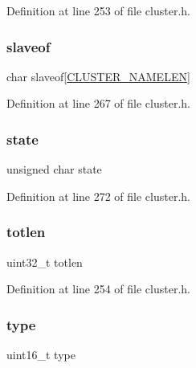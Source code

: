 Definition at line 253 of file cluster.\+h.

\mbox{\label{structcluster_msg_a110072ca1cda63a0b08d06c3195056e2}} 
\subsubsection{\texorpdfstring{slaveof}{slaveof}}
{\footnotesize\ttfamily char slaveof\mbox{[}\hyperlink{cluster_8h_ace7a882972eff7149675252938643b6e}{C\+L\+U\+S\+T\+E\+R\+\_\+\+N\+A\+M\+E\+L\+EN}\mbox{]}}



Definition at line 267 of file cluster.\+h.

\mbox{\label{structcluster_msg_ab12828525693568ae9c217805bea1ef9}} 
\subsubsection{\texorpdfstring{state}{state}}
{\footnotesize\ttfamily unsigned char state}



Definition at line 272 of file cluster.\+h.

\mbox{\label{structcluster_msg_a7c3d75c00327eb7e03f283418392443e}} 
\subsubsection{\texorpdfstring{totlen}{totlen}}
{\footnotesize\ttfamily uint32\+\_\+t totlen}



Definition at line 254 of file cluster.\+h.

\mbox{\label{structcluster_msg_acb5cfd209ba75c853d03f701e7f91679}} 
\subsubsection{\texorpdfstring{type}{type}}
{\footnotesize\ttfamily uint16\+\_\+t type}



